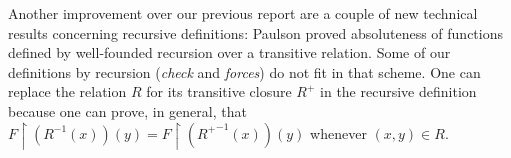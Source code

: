 Another improvement over our previous report are a couple of new
technical results concerning recursive definitions: Paulson proved
absoluteness of functions defined by well-founded recursion over a
transitive relation. Some of our definitions by recursion
(\emph{check} and \emph{forces}) do not fit in that scheme.  One can
replace the relation $R$ for its transitive closure $R^+$ in the
recursive definition because one can prove, in general, that
$F\!\upharpoonright\!(R^{-1}(x))(y) =
F\!\upharpoonright\!({R^+}^{-1}(x))(y)$ whenever $(x,y) \in R$.


